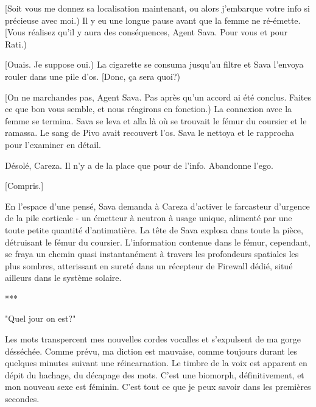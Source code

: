 [Soit vous me donnez sa localisation maintenant, ou alors j'embarque votre info si précieuse avec moi.) Il y eu une longue pause avant que la femme ne ré-émette. [Vous réalisez qu'il y aura des conséquences, Agent Sava. Pour vous et pour Rati.) 

[Ouais. Je suppose oui.) La cigarette se consuma jusqu'au filtre et Sava l'envoya rouler dans une pile d'os. [Donc, ça sera quoi?) 

[On ne marchandes pas, Agent Sava. Pas après qu'un accord ai été conclus. Faites ce que bon vous semble, et nous réagirons en fonction.) La connexion avec la femme se termina. Sava se leva et alla là où se trouvait le fémur du coursier et le ramassa. Le sang de Pivo avait recouvert l'os. Sava le nettoya et le rapprocha pour l'examiner en détail. 

Désolé, Careza. Il n'y a de la place que pour de l'info. Abandonne l'ego. 

[Compris.] 

En l'espace d'une pensé, Sava demanda à Careza d'activer le farcasteur d'urgence de la pile corticale - un émetteur à neutron à usage unique, alimenté par une toute petite quantité d'antimatière. La tête de Sava explosa dans toute la pièce, détruisant le fémur du coursier. L'information contenue dans le fémur, cependant, se fraya un chemin quasi instantanément à travers les profondeurs spatiales les plus sombres, atterissant en sureté dans un récepteur de Firewall dédié, situé ailleurs dans le système solaire. 

\begin{center} *** \end{center} 

"Quel jour on est?" 

Les mots transpercent mes nouvelles cordes vocalles et s'expulsent de ma gorge désséchée. Comme prévu, ma diction est mauvaise, comme toujours durant les quelques minutes suivant une réincarnation. Le timbre de la voix est apparent en dépit du hachage, du décapage des mots. C'est une biomorph, définitivement, et mon nouveau sexe est féminin. C'est tout ce que je peux savoir dans les premières secondes. 



